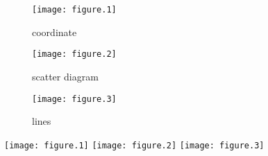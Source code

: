\documentclass[12pt]{article}
\begin{document}
\begin{figure}
    \begin{minipage}[t]{10cm}
      \centering
      \texttt{[image: figure.1]}
      \centerline{coordinate}
    \end{minipage}
    
    \begin{minipage}[t]{10cm}
      \centering
      \texttt{[image: figure.2]}
      \centerline{scatter diagram}
    \end{minipage}
    
    \begin{minipage}[t]{10cm}
      \centering
      \texttt{[image: figure.3]}
      \centerline{lines}
    \end{minipage}
\end{figure}
\texttt{[image: figure.1]}
\texttt{[image: figure.2]}
\texttt{[image: figure.3]}
\end{document}
